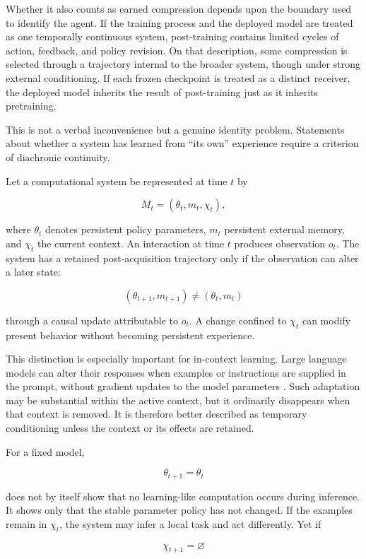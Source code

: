 \documentclass[11pt]{article}
\begin{document}
Whether it also counts as earned compression depends upon the boundary used to identify the agent. If the training process and the deployed model are treated as one temporally continuous system, post-training contains limited cycles of action, feedback, and policy revision. On that description, some compression is selected through a trajectory internal to the broader system, though under strong external conditioning. If each frozen checkpoint is treated as a distinct receiver, the deployed model inherits the result of post-training just as it inherits pretraining.

This is not a verbal inconvenience but a genuine identity problem. Statements about whether a system has learned from ``its own'' experience require a criterion of diachronic continuity.

Let a computational system be represented at time $t$ by

\[
M_t
=
(\theta_t,m_t,\chi_t),
\]

where $\theta_t$ denotes persistent policy parameters, $m_t$ persistent external memory, and $\chi_t$ the current context. An interaction at time $t$ produces observation $o_t$. The system has a retained post-acquisition trajectory only if the observation can alter a later state:

\[
(\theta_{t+1},m_{t+1})
\neq
(\theta_t,m_t)
\]

through a causal update attributable to $o_t$. A change confined to $\chi_t$ can modify present behavior without becoming persistent experience.

This distinction is especially important for in-context learning. Large language models can alter their responses when examples or instructions are supplied in the prompt, without gradient updates to the model parameters \cite{brown2020}. Such adaptation may be substantial within the active context, but it ordinarily disappears when that context is removed. It is therefore better described as temporary conditioning unless the context or its effects are retained.

For a fixed model,

\[
\theta_{t+1}=\theta_t
\]

does not by itself show that no learning-like computation occurs during inference. It shows only that the stable parameter policy has not changed. If the examples remain in $\chi_t$, the system may infer a local task and act differently. Yet if

\[
\chi_{t+1}=\varnothing
\]
\end{document}
